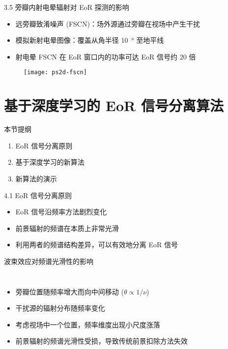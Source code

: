 \documentclass{beamer}
\begin{document}
\begin{frame}{3.5 旁瓣内射电晕辐射对 EoR 探测的影响}
  \begin{itemize}
    \item \alert{远旁瓣致淆噪声 (FSCN)}：场外源通过旁瓣在视场中产生干扰
    \item 模拟新射电晕图像：覆盖从角半径 \SI{10}{\degree} 至地平线
    \item 射电晕 FSCN 在 EoR 窗口内的功率可达 EoR 信号约 20 倍
  \end{itemize}
  \begin{figure}
    \centering
    \texttt{[image: ps2d-fscn]}
  \end{figure}
\end{frame}


\section{基于深度学习的 EoR 信号分离算法}

\begin{frame}
  \begin{block}{本节提纲}
  \begin{enumerate}
    \item EoR 信号分离原则
    \item 基于深度学习的新算法
    \item 新算法的演示
  \end{enumerate}
  \end{block}
\end{frame}

\begin{frame}{4.1 EoR 信号分离原则}
  \begin{itemize}
    \item EoR 信号沿频率方法剧烈变化
    \item 前景辐射的频谱在本质上非常光滑
    \item 利用两者的频谱结构差异，可以有效地分离 EoR 信号
  \end{itemize}
\end{frame}

\begin{frame}[t]
  \begin{alertblock}{波束效应对频谱光滑性的影响}
  \end{alertblock}
  \begin{columns}
    \begin{itemize}
      \item 旁瓣位置随频率增大而向中间移动 ($\theta \propto 1/\nu$)
      \item 干扰源的辐射分布随频率变化
      \item 考虑视场中一个位置，频率维度出现小尺度涨落
      \item 前景辐射的频谱光滑性受损，导致传统前景扣除方法失效
    \end{itemize}

  \end{columns}
\end{frame}
\end{document}
